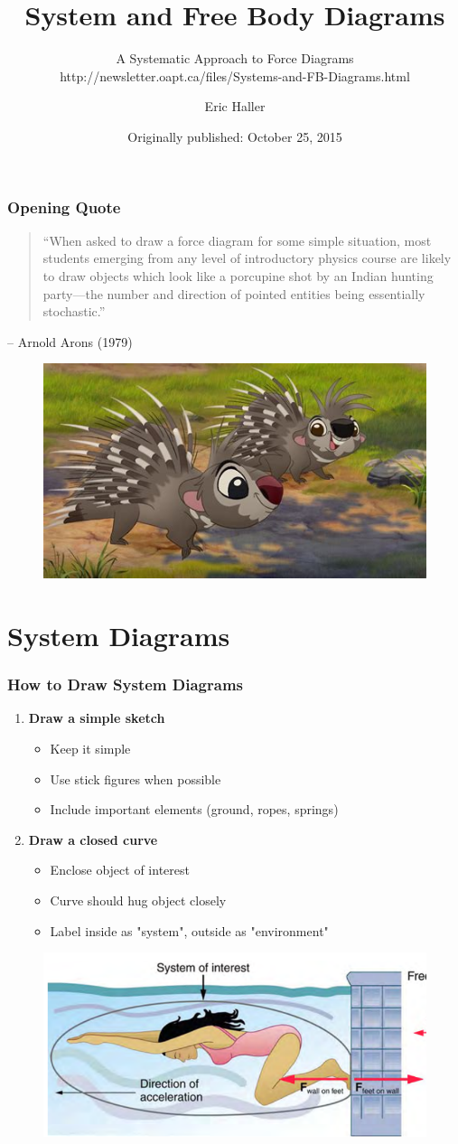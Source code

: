 \documentclass{beamer}
\title[System \& Free Body Diagrams]{System and Free Body Diagrams}
\subtitle{A Systematic Approach to Force Diagrams\\http://newsletter.oapt.ca/files/Systems-and-FB-Diagrams.html}
\author[E. Haller]{Eric Haller}
\date[2015]{Originally published: October 25, 2015}
\begin{document}
\frame{\titlepage}

\begin{frame}
\frametitle{Opening Quote}
\begin{quote}
``When asked to draw a force diagram for some simple situation, most students emerging from any level of introductory physics course are likely to draw objects which look like a porcupine shot by an Indian hunting party—the number and direction of pointed entities being essentially stochastic.''
\end{quote}
\vspace{0.5cm}
\hfill -- Arnold Arons (1979)
\begin{figure}[H]
    \centering
    \includegraphics[width=0.5\linewidth]{CH4/Porcupinebros.jpg}
\end{figure}
\end{frame}

\section{System Diagrams}

\begin{frame}
\frametitle{How to Draw System Diagrams}
\begin{enumerate}
    \item \textbf{Draw a simple sketch}
    \begin{itemize}
        \item Keep it simple
        \item Use stick figures when possible
        \item Include important elements (ground, ropes, springs)
    \end{itemize}
    \item \textbf{Draw a closed curve}
    \begin{itemize}
        \item Enclose object of interest
        \item Curve should hug object closely
        \item Label inside as "system", outside as "environment"
    \end{itemize}
\end{enumerate}
\begin{figure}
    \centering
    \includegraphics[width=0.5\linewidth]{CH4/Screenshot 2024-11-07 105535.png}
\end{figure}

\end{frame}
\end{document}
